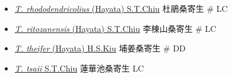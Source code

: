 \begin{itemize}
\begin{itemize}
        \item[] \href{http://www.theplantlist.org/tpl1.1/search?q=Taxillus+rhododendricolius}{\textit{T. rhododendricolius} (Hayata) S.T.Chiu}   杜鵑桑寄生  \# LC
        \item[] \href{http://www.theplantlist.org/tpl1.1/search?q=Taxillus+ritozanensis}{\textit{T. ritozanensis} (Hayata) S.T.Chiu}   李棟山桑寄生  \# LC
        \item[] \href{http://www.theplantlist.org/tpl1.1/search?q=Taxillus+theifer}{\textit{T. theifer} (Hayata) H.S.Kiu}   埔姜桑寄生  \# DD
        \item[] \href{http://www.theplantlist.org/tpl1.1/search?q=Taxillus+tsaii}{\textit{T. tsaii} S.T.Chiu}   蓮華池桑寄生   LC
  \end{itemize}
  \end{itemize}

